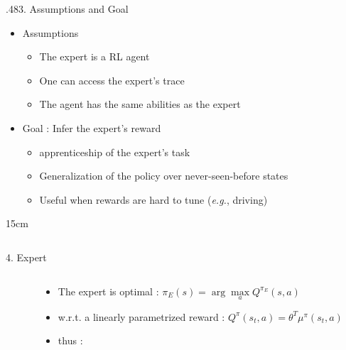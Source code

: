 \documentclass[xcolor=x11names,12pt]{beamer}
\begin{document}
\begin{frame}
{\begin{columns}
\begin{column}{.48\textwidth}
    \end{column}
  \end{columns}
}
{.48}{3. Assumptions and Goal}{
  \begin{itemize}
  \item Assumptions
    \begin{itemize}
    \item The expert is a RL agent
    \item One can access the expert's trace
    \item The agent has the same abilities as the expert
    \end{itemize}
  \item Goal : Infer the expert's reward
    \begin{itemize}
    \item apprenticeship of the expert's task
    \item Generalization of the policy over never-seen-before states
    \item Useful when rewards are hard to tune ({\it e.g.}, driving)
    \end{itemize}
  \end{itemize}
}
{15cm}
\vfill
\begin{columns}
  \begin{column}{.48\textwidth}
    \begin{block}{4. Expert}
      \begin{columns}
        \begin{column}{0.001\textwidth}
          \vspace{8cm}
        \end{column}
        \begin{column}{\textwidth}
          \begin{itemize}
          \item The expert is optimal : $\pi_E(s) = \arg\max\limits_{a} Q^{\pi_E}(s,a)$
          \item w.r.t. a linearly parametrized reward : $Q^\pi(s_t,a) = \theta^T\mu^\pi(s_t,a)$
          \item thus : 
          \end{itemize}
        \end{column}
      \end{columns}
    \end{block}
    \vspace{1cm}

\end{column}
\end{columns}
\end{frame}
\end{document}
